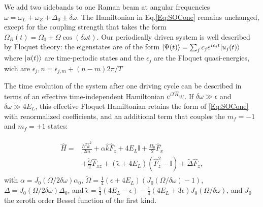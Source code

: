 We add two sidebands to one Raman beam at angular frequencies $\omega=\omega_L+\omega_Z+\Delta_0 \pm \delta\omega$.  The Hamiltonian in Eq.\ref{Eq:SOCone} remains unchanged, except for the coupling strength that takes the form $	\Omega_R(t)=\Omega_0 + \Omega\cos(\delta\omega t)$. Our periodically driven system is well described by Floquet theory: the eigenstates are of the form $|\Psi(t)\rangle=\sum_{j}c_je^{i\epsilon_jt}|u_j(t)\rangle$ where $|u(t)\rangle$ are time-periodic states and the $\epsilon_j$ are the Floquet quasi-energies, wich are  $\epsilon_j,n=\epsilon_{j,m} + (n-m)2\pi/T$


The time evolution of the system after one driving cycle can be described in terms of an effective time-independent Hamiltonian $e^{iT\hat{H}_{eff}}$. If $\delta\omega \gg \epsilon$ and $\delta\omega \gg 4E_L$, this effective Floquet Hamiltonian retains the form of \ref{Eq:SOCone} with renormalized coefficients, and an additional term that couples the $m_f=-1$ and $m_f=+1$ states:

\begin{align}
	\begin{split}
		\hat{H} = &\frac{\hbar^2\hat{k}^2}{2m} + \alpha\hat{k}\hat{F}_z +4E_L\mathbb{I} + \frac{\Omega_0}{2}\hat{F}_x \\
		&+ \frac{\tilde{\Omega}}{2}\hat{F}_{xz} +(\tilde{\epsilon}+4E_L)(\hat{F}_z^2-\mathbb{I}) +\tilde{\Delta}\hat{F}_z, 
		\label{Eq:SOCeff}
	\end{split}
\end{align}	
%
with $\alpha= J_0(\Omega/2\delta\omega)\alpha_0$, $\tilde{\Omega}=\frac{1}{4}(\epsilon+4E_L) (J_0(\Omega/\delta\omega)-1)$, $\Delta=J_0(\Omega/2\delta\omega)\Delta_0$, and $\tilde{\epsilon}= \frac{1}{4}(4E_L-\epsilon) - 
\frac{1}{4}(4E_L + 3 \epsilon) J_0( \Omega/\delta\omega)$, and $J_0$ the zeroth order Bessel function of the first kind.

